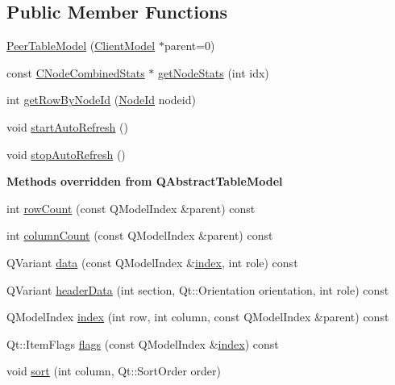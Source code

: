 \subsection*{Public Member Functions}
\begin{DoxyCompactItemize}
\item 
\hyperlink{class_peer_table_model_a94e40794eeb946475a4a747c1fe1a2c2}{Peer\+Table\+Model} (\hyperlink{class_client_model}{Client\+Model} $\ast$parent=0)
\item 
const \hyperlink{struct_c_node_combined_stats}{C\+Node\+Combined\+Stats} $\ast$ \hyperlink{class_peer_table_model_a98084d3299642316c71c5de3d36b9859}{get\+Node\+Stats} (int idx)
\item 
int \hyperlink{class_peer_table_model_aa735d366015dafba4c5d79dfb76abe49}{get\+Row\+By\+Node\+Id} (\hyperlink{net_8h_a954d746a58632565552615fd0a4ee660}{Node\+Id} nodeid)
\item 
void \hyperlink{class_peer_table_model_aba0f9c1535e2d718950edea1c166cc9d}{start\+Auto\+Refresh} ()
\item 
void \hyperlink{class_peer_table_model_a2a738ac95fc16e0e1db9693eadc4f8b4}{stop\+Auto\+Refresh} ()
\end{DoxyCompactItemize}
\begin{Indent}{\bf Methods overridden from Q\+Abstract\+Table\+Model}\par
\begin{DoxyCompactItemize}
\item 
int \hyperlink{class_peer_table_model_ab25fdcf93bf84c7aaa4c1e16135db35f}{row\+Count} (const Q\+Model\+Index \&parent) const 
\item 
int \hyperlink{class_peer_table_model_a57b217f2d29273d85501d3d14074fe7e}{column\+Count} (const Q\+Model\+Index \&parent) const 
\item 
Q\+Variant \hyperlink{class_peer_table_model_a02a6cba12854415bc67def00300252d7}{data} (const Q\+Model\+Index \&\hyperlink{class_peer_table_model_addd566b4bd58315a6db0fbd7e8c6b70a}{index}, int role) const 
\item 
Q\+Variant \hyperlink{class_peer_table_model_a9591c18e40358b0b9f97835e60b56904}{header\+Data} (int section, Qt\+::\+Orientation orientation, int role) const 
\item 
Q\+Model\+Index \hyperlink{class_peer_table_model_addd566b4bd58315a6db0fbd7e8c6b70a}{index} (int row, int column, const Q\+Model\+Index \&parent) const 
\item 
Qt\+::\+Item\+Flags \hyperlink{class_peer_table_model_a0f5cc73fce970b6bcc0f23f7d56f1e79}{flags} (const Q\+Model\+Index \&\hyperlink{class_peer_table_model_addd566b4bd58315a6db0fbd7e8c6b70a}{index}) const 
\item 
void \hyperlink{class_peer_table_model_ac2211cda0ce659ac4c324c6ff24e1e5f}{sort} (int column, Qt\+::\+Sort\+Order order)
\end{DoxyCompactItemize}
\end{Indent}


